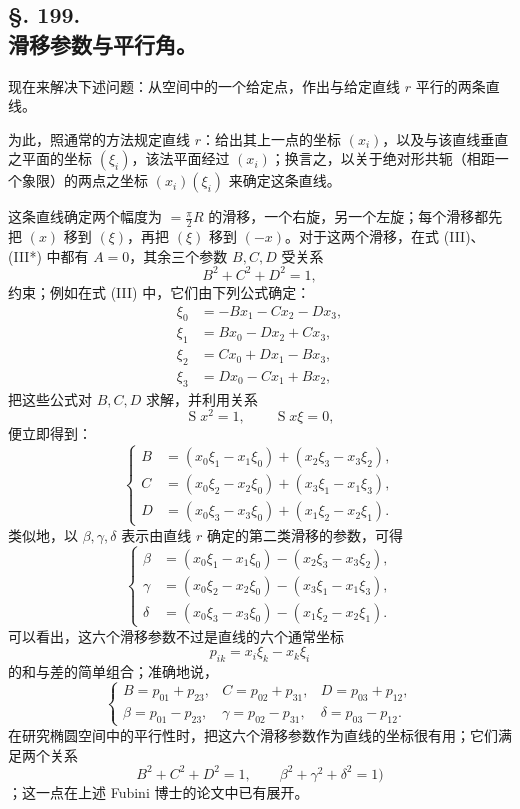 \subsection*{§. 199.\\ 滑移参数与平行角。}

现在来解决下述问题：从空间中的一个给定点，作出与给定直线 \(r\) 平行的两条直线。

为此，照通常的方法规定直线 \(r\)：给出其上一点的坐标 \((x_i)\)，以及与该直线垂直之平面的坐标 \((\xi_i)\)，该法平面经过 \((x_i)\)；换言之，以关于绝对形共轭（相距一个象限）的两点之坐标 \((x_i)(\xi_i)\) 来确定这条直线。

这条直线确定两个幅度为 \(=\frac\pi2R\) 的滑移，一个右旋，另一个左旋；每个滑移都先把 \((x)\) 移到 \((\xi)\)，再把 \((\xi)\) 移到 \((-x)\)。对于这两个滑移，在式 (III)、(III*) 中都有 \(A=0\)，其余三个参数 \(B,C,D\) 受关系
\[
 B^2+C^2+D^2=1,
\]
约束；例如在式 (III) 中，它们由下列公式确定：
\[
\begin{aligned}
\xi_0&=-Bx_1-Cx_2-Dx_3,\\
\xi_1&=Bx_0-Dx_2+Cx_3,\\
\xi_2&=Cx_0+Dx_1-Bx_3,\\
\xi_3&=Dx_0-Cx_1+Bx_2,
\end{aligned}
\]
把这些公式对 \(B,C,D\) 求解，并利用关系
\[
 \mathop{\mathrm{S}}x^2=1,
 \qquad \mathop{\mathrm{S}}x\xi=0,
\]
便立即得到：
\[
\tag{42}
\left\{
\begin{aligned}
 B&=(x_0\xi_1-x_1\xi_0)+(x_2\xi_3-x_3\xi_2),\\
 C&=(x_0\xi_2-x_2\xi_0)+(x_3\xi_1-x_1\xi_3),\\
 D&=(x_0\xi_3-x_3\xi_0)+(x_1\xi_2-x_2\xi_1).
\end{aligned}\right.
\]
类似地，以 \(\beta,\gamma,\delta\) 表示由直线 \(r\) 确定的第二类滑移的参数，可得
\[
\tag{42*}
\left\{
\begin{aligned}
 \beta&=(x_0\xi_1-x_1\xi_0)-(x_2\xi_3-x_3\xi_2),\\
 \gamma&=(x_0\xi_2-x_2\xi_0)-(x_3\xi_1-x_1\xi_3),\\
 \delta&=(x_0\xi_3-x_3\xi_0)-(x_1\xi_2-x_2\xi_1).
\end{aligned}\right.
\]
可以看出，这六个滑移参数不过是直线的六个通常坐标
\[
 p_{ik}=x_i\xi_k-x_k\xi_i
\]
的和与差的简单组合；准确地说，
\[
\tag{43}
\left\{
\begin{array}{lll}
B=p_{01}+p_{23},& C=p_{02}+p_{31},& D=p_{03}+p_{12},\\
\beta=p_{01}-p_{23},& \gamma=p_{02}-p_{31},& \delta=p_{03}-p_{12}.
\end{array}\right.
\]
在研究椭圆空间中的平行性时，把这六个滑移参数作为直线的坐标很有用；它们满足两个关系
\[
 B^2+C^2+D^2=1,
 \qquad \beta^2+\gamma^2+\delta^2=1)
\]
；这一点在上述 Fubini 博士的论文中已有展开。


